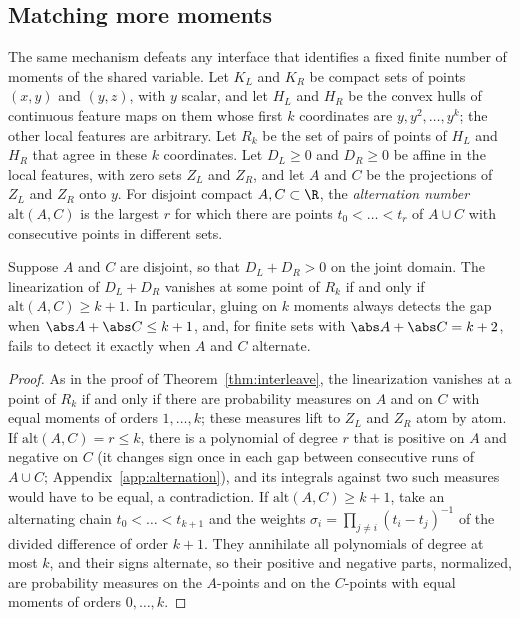 \subsection{Matching more moments}\label{sec:k-moments}

The same mechanism defeats any interface that identifies a fixed finite
number of moments of the shared variable. Let $K_L$ and $K_R$ be compact
sets of points $(x,y)$ and $(y,z)$, with $y$ scalar, and let $H_L$ and
$H_R$ be the convex hulls of continuous feature maps on them whose first
$k$ coordinates are $y,y^2,\dots,y^k$; the other local features are
arbitrary. Let $R_k$ be the set of pairs of points of $H_L$ and $H_R$ that
agree in these $k$ coordinates. Let $D_L\ge0$ and $D_R\ge0$ be affine
in the local features, with zero sets $Z_L$ and $Z_R$, and let $A$ and
$C$ be the projections of $Z_L$ and $Z_R$ onto $y$. For disjoint compact
$A,C\subset\R$, the \emph{alternation number} $\mathrm{alt}(A,C)$ is the
largest $r$ for which there are points $t_0<\dots<t_r$ of $A\cup C$ with
consecutive points in different sets.

\begin{theorem}[Alternation]\label{thm:alternation}
Suppose $A$ and $C$ are disjoint, so that $D_L+D_R>0$ on the joint
domain. The linearization of $D_L+D_R$ vanishes at some point of $R_k$ if
and only if $\mathrm{alt}(A,C)\ge k+1$. In particular, gluing on $k$
moments always detects the gap when $\abs A+\abs C\le k+1$, and, for
finite sets with $\abs A+\abs C=k+2$, fails to detect it exactly when $A$
and $C$ alternate.
\end{theorem}

\begin{proof}
As in the proof of Theorem~\ref{thm:interleave}, the linearization
vanishes at a point of $R_k$ if and only if there are probability measures
on $A$ and on $C$ with equal moments of orders $1,\dots,k$; these measures
lift to $Z_L$ and $Z_R$ atom by atom. If $\mathrm{alt}(A,C)=r\le k$, there is
a polynomial of degree $r$ that is positive on $A$ and negative on $C$
(it changes sign once in each gap between consecutive runs of $A\cup C$;
Appendix~\ref{app:alternation}), and its integrals against two such
measures would have to be equal, a contradiction. If
$\mathrm{alt}(A,C)\ge k+1$, take an alternating chain $t_0<\dots<t_{k+1}$
and the weights $\sigma_i=\prod_{j\ne i}(t_i-t_j)^{-1}$ of the divided
difference of order $k+1$. They annihilate all polynomials of degree at
most $k$, and their signs alternate, so their positive and negative parts,
normalized, are probability measures on the $A$-points and on the
$C$-points with equal moments of orders $0,\dots,k$.
\end{proof}

